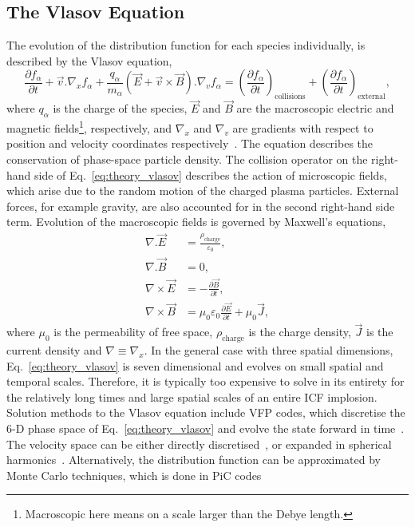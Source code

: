 \subsection{The Vlasov Equation}%
\label{sec:theory_vlasov}

The evolution of the distribution function for each species individually, is described by the Vlasov equation,
\begin{equation}
    \label{eq:theory_vlasov}
    \frac{\partial f_\alpha}{\partial t} + \vec{v}.\nabla_x f_\alpha + \frac{q_\alpha}{m_\alpha} (\vec{E} + \vec{v}\times\vec{B}) . \nabla_v f_\alpha = \left ( \frac{\partial f_\alpha}{\partial t} \right )_\text{collisions} + \left ( \frac{\partial f_\alpha}{\partial t} \right )_\text{external},
\end{equation}
where $q_\alpha$ is the charge of the species, $\vec{E}$ and $\vec{B}$ are the macroscopic electric and magnetic fields\footnote{Macroscopic here means on a scale larger than the Debye length.}, respectively, and $\nabla_x$ and $\nabla_v$ are gradients with respect to position and velocity coordinates respectively~\cite{bittencourt_fundamentals_2004}.
The equation describes the conservation of phase-space particle density.
The collision operator on the right-hand side of Eq.~\ref{eq:theory_vlasov} describes the action of microscopic fields, which arise due to the random motion of the charged plasma particles.
External forces, for example gravity, are also accounted for in the second right-hand side term.
Evolution of the macroscopic fields is governed by Maxwell's equations,
\begin{align}
    \label{eq:theory_maxwell_eqs_1}
    \nabla.\vec{E} &= \frac{\rho_{\text{charge}}}{\varepsilon_0},\\
    \label{eq:theory_maxwell_eqs_2}
    \nabla.\vec{B} &= 0,\\
    \label{eq:theory_maxwell_eqs_3}
    \nabla \times \vec{E} &= -\frac{\partial \vec{B}}{\partial t},\\
    \label{eq:theory_maxwell_eqs_4}
    \nabla \times \vec{B} &= \mu_0 \varepsilon_0\frac{\partial \vec{E}}{\partial t} + \mu_0 \vec{J},
\end{align}
where $\mu_0$ is the permeability of free space, $\rho_{\text{charge}}$ is the charge density, $\vec{J}$ is the current density and $\nabla\equiv \nabla_x$.
In the general case with three spatial dimensions, Eq.~\ref{eq:theory_vlasov} is seven dimensional and evolves on small spatial and temporal scales.
Therefore, it is typically too expensive to solve in its entirety for the relatively long times and large spatial scales of an entire \ac{ICF} implosion.
Solution methods to the Vlasov equation include \ac{VFP} codes, which discretise the 6-D phase space of Eq.~\ref{eq:theory_vlasov} and evolve the state forward in time~\cite{thomas_review_2012}.
The velocity space can be either directly discretised~\cite{taitano_eulerian_2021}, or expanded in spherical harmonics~\cite{kingham_implicit_2004}.
Alternatively, the distribution function can be approximated by Monte Carlo techniques, which is done in \ac{PiC} codes~\cite{arber_contemporary_2015}

